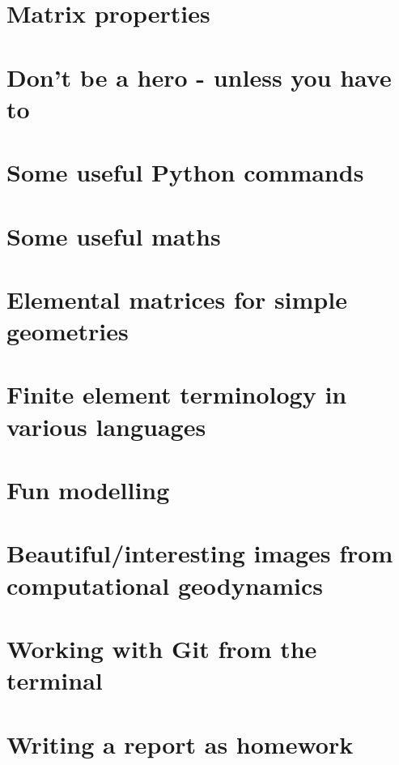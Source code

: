 \documentclass[a4paper,12pt]{report}
\begin{document}
\chapter{Matrix properties}  %
\chapter{Don't be a hero - unless you have to}  %
\chapter{Some useful Python commands}  %
\chapter{Some useful maths}  \label{app_maths} %
\chapter{Elemental matrices for simple geometries}\label{app:mm}  %
\chapter{Finite element terminology in various languages}  %
\chapter{Fun modelling}  %
\chapter{Beautiful/interesting images from computational geodynamics} %
\chapter{Working with Git from the terminal}  %
\chapter{Writing a report as homework \label{app:grading}}  %
\end{document}
